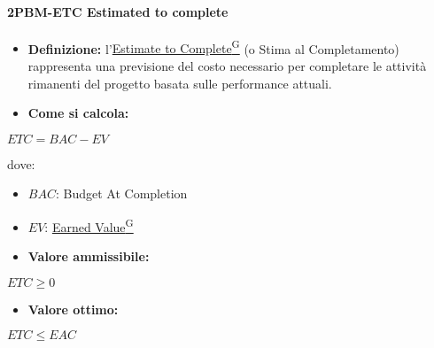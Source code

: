 \paragraph*{2PBM-ETC Estimated to complete}
\begin{itemize}
    \item \textbf{Definizione:} l’\href{https://code7crusaders.github.io/docs/PB/documentazione_interna/glossario.html#estimate-to-complete}{Estimate to Complete\textsuperscript{G}} (o Stima al Completamento) rappresenta una previsione del costo necessario per completare le attività rimanenti del progetto basata sulle performance attuali.
    \item \textbf{Come si calcola:}
\end{itemize}
\begin{center}
   $ETC = BAC - EV$ 
\end{center}
dove:
\begin{itemize}[label=$\rightarrow$]
    \item $BAC$: Budget At Completion
    \item $EV$: \href{https://code7crusaders.github.io/docs/PB/documentazione_interna/glossario.html#earned-value}{Earned Value\textsuperscript{G}}
\end{itemize}
\begin{itemize}
    \item \textbf{Valore ammissibile:}
\end{itemize}
\begin{center}
    $ETC \geq 0$
\end{center}
\begin{itemize}
    \item \textbf{Valore ottimo:}
\end{itemize}
\begin{center}
    $ETC \leq EAC$
\end{center}


